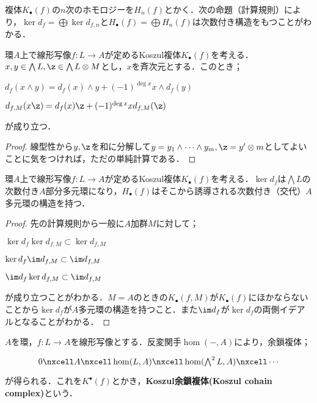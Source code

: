 複体$K_\bullet(f)$の$n$次のホモロジーを$H_n(f)$とかく．次の命題（計算規則）により，$\ker d_f=\bigoplus \ker d_{f,n}$と$H_\bullet(f)=\bigoplus H_n(f)$は次数付き構造をもつことがわかる．

\begin{lem}
	環$A$上で線形写像$f:L\to A$が定めるKoszul複体$K_\bullet(f)$を考える．$x,y\in\bigwedge L,\z\in\bigwedge L\otimes M$とし，$x$を斉次元とする．このとき；
	\begin{sakura}
		\item $d_f(x\wedge y)=d_f(x)\wedge y+(-1)^{\deg x}x\wedge d_f(y)$
		\item $d_{f,M}(x\z)=d_f(x)\z+(-1)^{\deg x}xd_{f,M}(\z)$
	\end{sakura}
	が成り立つ．
\end{lem}
\begin{proof}
	線型性から$y,\z$を和に分解して$y=y_1\wedge\dots\wedge y_m, \z=y'\otimes m$としてよいことに気をつければ，ただの単純計算である．
\end{proof}

\begin{prop}
	環$A$上で線形写像$f:L\to A$が定めるKoszul複体$K_\bullet(f)$を考える．$\ker d_f$は$\bigwedge L$の次数付き$A$部分多元環になり，$H_\bullet(f)$はそこから誘導される次数付き（交代）$A$多元環の構造を持つ．
\end{prop}

\begin{proof}
	先の計算規則から一般に$A$加群$M$に対して；
	\begin{sakura}
		\item $\ker d_f\ker d_{f,M}\subset\ker d_{f,M}$
		\item $\ker d_f\im d_{f,M}\subset\im d_{f,M}$
		\item $\im d_f\ker d_{f,M}\subset\im d_{f,M}$
	\end{sakura}
	が成り立つことがわかる．$M=A$のときの$K_\bullet(f,M)$が$K_\bullet(f)$にほかならないことから$\ker d_f$が$A$多元環の構造を持つこと．また$\im d_f$が$\ker d_f$の両側イデアルとなることがわかる．
\end{proof}

\begin{defi}[Koszul余鎖複体]
	$A$を環，$f:L\to A$を線形写像とする．反変関手$\hom(-,A)$により，余鎖複体；
	\[\begin{tikzcd}
	0\nxcell A\nxcell\hom(L,A)\nxcell\hom(\bigwedge^2L,A)\nxcell\cdots
	\end{tikzcd}\]
	が得られる．これを$K^\bullet(f)$とかき，\textbf{Koszul余鎖複体(Koszul cohain complex)}という．
\end{defi}

